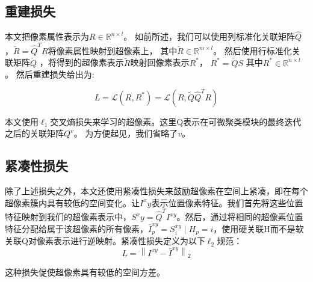 \subsection{重建损失}

本文把像素属性表示为$R\in \mathbb{R}^{n\times l}$。
如前所述，我们可以使用列标准化关联矩阵$\hat{Q}$，$\breve{R}=\hat{Q}^{T}R$将像素属性映射到超像素上，
其中$\breve{R}\in \mathbb{R}^{m\times l}$。
然后使用行标准化关联矩阵$\tilde{Q}$ ，将得到的超像素表示$\breve{R}$映射回像素表示$R^{\ast }$，
$R^{\ast } = \tilde{Q}S$ 其中$R^{\ast } \in \mathbb{R}^{n\times l}$。
然后重建损失给出为:

\begin{equation}
L = \mathscr{L}(R,R^{*}) = \mathscr{L}(R,\tilde{Q}\hat{Q}^{T}R)
\end{equation}

本文使用$\ell_1$交叉熵损失来学习的超像素。这里Q表示在可微聚类模块的最终迭代之后的关联矩阵$Q^{v}$。
为方便起见，我们省略了$v$。

\subsection{紧凑性损失}

除了上述损失之外，本文还使用紧凑性损失来鼓励超像素在空间上紧凑，即在每个超像素簇内具有较低的空间变化。让$I^xy$表示位置像素特征。我们首先将这些位置特征映射到我们的超像素表示中，$S^xy=\hat{Q}^{T}I^{xy}$。然后，通过将相同的超像素位置特征分配给属于该超像素的所有像素，$\bar{I}_{p}^{xy} = S_{i}^{xy}\mid H_{p}=i$，使用硬关联H而不是软关联Q对像素表示进行逆映射。紧凑性损失定义为以下$\ell_2$规范：
\begin{equation}
L = \left \|I^{xy}-\bar{I}^{xy} \right \|_{2}
\end{equation}

这种损失促使超像素具有较低的空间方差。